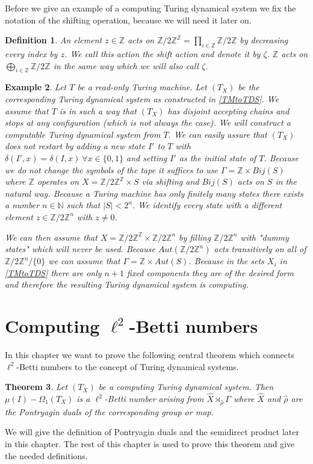 \documentclass[12pt,a4paper]{scrartcl}
\newtheorem{Theorem}{Theorem}[section]
\newtheorem{Definition}[Theorem]{Definition}
\newtheorem{Example}[Theorem]{Example}
\numberwithin{equation}{section}
\newcommand{\Z}{\mathbb{Z}} %
\newcommand{\N}{\mathbb{N}} %
\newcommand{\2}{\mathbb{Z} / 2 \mathbb{Z}}
\newcommand{\1}{\bar{1}}
\newcommand{\0}{\bar{0}}
\begin{document}
Before we give an example of a computing Turing dynamical system we fix the notation of the shifting operation, because we will need it later on.
\begin{Definition} \label{shift}
	An element $z \in \Z$ acts on $\2^{\Z} = \prod_{i \in \Z} \2$ by decreasing every index by $z$. We call this action the shift action and denote it by $\zeta$. $\Z$ acts on $\bigoplus_{i \in \Z} \2$ in the same way which we will also call $\zeta$.
\end{Definition}
\begin{Example} \label{roTMtoTDS}
	Let $T$ be a read-only Turing machine. Let $(T_X)$ be the corresponding Turing dynamical system as constructed in \ref{TMtoTDS}. We assume that $T$ is in such a way that $(T_X)$ has disjoint accepting chains and stops at any configuration (which is not always the case). We will construct a computable Turing dynamical system from $T$.  We can easily assure that $(T_X)$ does not restart by adding a new state $I'$ to $T$ with $\delta(I', x) = \delta(I, x) \ \forall x \in \{0,1\}$ and setting $I'$ as the initial state of $T$. Because we do not change the symbols of the tape it suffices to use $\Gamma = \Z \times Bij(S)$ where $\Z$ operates on $X = \2^\Z \times S$ via shifting and $Bij(S)$ acts on $S$ in the natural way. Because a Turing machine has only finitely many states there exists a number $n \in \N$ such that $|S| < 2^n$. We identify every state with a different element $z \in \2^n$ with $z \neq 0$.
	
	 We can then assume that $X = \2^\Z \times \2^n$ by filling $\2^n$ with "dummy states" which will never be used. Because $Aut(\2^n)$ acts transitively on all of $\2^n / \{0\}$ we can assume that $\Gamma = \Z \times Aut(S)$. Because in the sets $X_i$ in \ref{TMtoTDS} there are only $n+1$ fixed components they are of the desired form and therefore the resulting Turing dynamical system is computing.
\end{Example}


\section{Computing $\ell^2$-Betti numbers}
In this chapter we want to prove the following central theorem which connects $\ell^2$-Betti numbers to the concept of Turing dynamical systems.
\begin{Theorem} \label{HS}
	Let $(T_X)$ be a computing Turing dynamical system. Then $\mu (I) - \Omega_1(T_X)$ is a $\ell^2$-Betti number arising from $\hat{X} \rtimes_{\hat{\rho}} \Gamma$ where $\hat{X}$ and $\hat{\rho}$ are the Pontryagin duals of the corresponding group or map.
\end{Theorem}
We will give the definition of Pontryagin duals and the semidirect product later in this chapter. The rest of this chapter is used to prove this theorem and give the needed definitions.
\end{document}
